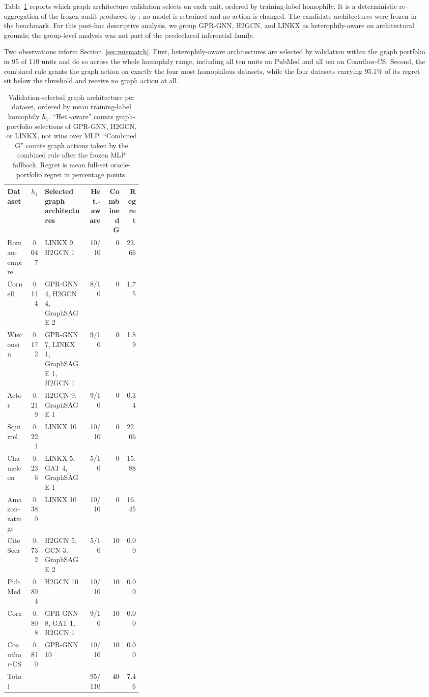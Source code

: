 Table~\ref{tab:winning_architectures} reports which graph architecture validation selects on each unit, ordered by training-label homophily. It is a deterministic re-aggregation of the frozen audit produced by ; no model is retrained and no action is changed. The candidate architectures were frozen in the benchmark. For this post-hoc descriptive analysis, we group GPR-GNN, H2GCN, and LINKX as heterophily-aware on architectural grounds; the group-level analysis was not part of the predeclared inferential family.

Two observations inform Section~\ref{sec:mismatch}. First, heterophily-aware architectures are selected by validation within the graph portfolio in 95 of 110 units and do so across the whole homophily range, including all ten units on PubMed and all ten on Coauthor-CS. Second, the combined rule grants the graph action on exactly the four most homophilous datasets, while the four datasets carrying 95.1\% of its regret sit below the threshold and receive no graph action at all.

\begin{table}[ht]
\centering
\caption{Validation-selected graph architecture per dataset, ordered by mean training-label homophily $h_1$. ``Het.-aware'' counts graph-portfolio selections of GPR-GNN, H2GCN, or LINKX, not wins over MLP. ``Combined G'' counts graph actions taken by the combined rule after the frozen MLP fallback. Regret is mean full-set oracle-portfolio regret in percentage points.}
\label{tab:winning_architectures}
\scriptsize
\setlength{\tabcolsep}{2.0pt}
\begin{tabular}{@{}lr>{\raggedright\arraybackslash}p{0.32\linewidth}rrr@{}}
\toprule
Dataset & $h_1$ & Selected graph architectures & Het.-aware & \shortstack{Combined\\G} & Regret \\
\midrule
Roman-empire & 0.047 & LINKX 9, H2GCN 1 & 10/10 & 0 & 23.66 \\
Cornell & 0.114 & GPR-GNN 4, H2GCN 4, GraphSAGE 2 & 8/10 & 0 & 1.75 \\
Wisconsin & 0.172 & GPR-GNN 7, LINKX 1, GraphSAGE 1, H2GCN 1 & 9/10 & 0 & 1.89 \\
Actor & 0.219 & H2GCN 9, GraphSAGE 1 & 9/10 & 0 & 0.34 \\
Squirrel & 0.221 & LINKX 10 & 10/10 & 0 & 22.06 \\
Chameleon & 0.236 & LINKX 5, GAT 4, GraphSAGE 1 & 5/10 & 0 & 15.88 \\
Amazon-ratings & 0.380 & LINKX 10 & 10/10 & 0 & 16.45 \\
CiteSeer & 0.732 & H2GCN 5, GCN 3, GraphSAGE 2 & 5/10 & 10 & 0.00 \\
PubMed & 0.804 & H2GCN 10 & 10/10 & 10 & 0.00 \\
Cora & 0.808 & GPR-GNN 8, GAT 1, H2GCN 1 & 9/10 & 10 & 0.00 \\
Coauthor-CS & 0.810 & GPR-GNN 10 & 10/10 & 10 & 0.00 \\
\midrule
Total & --- & --- & 95/110 & 40 & 7.46 \\
\bottomrule
\end{tabular}
\end{table}

